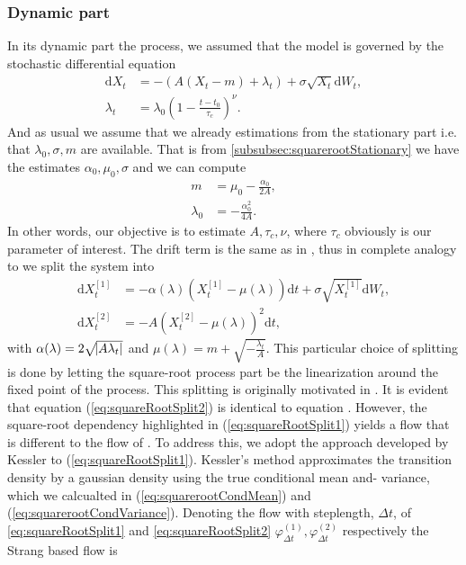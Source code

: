\subsubsection{Dynamic part}\label{subsubsec:squarerootDynamic}
In its dynamic part the process, we assumed that the model is governed by the stochastic differential equation
\begin{align}
    \mathrm{d}X_t &= -\left(A\left(X_t - m\right) + \lambda_t\right) + \sigma \sqrt{X_t} \mathrm{d}W_t, \label{eq:dynamicsquarerootSDE}\\
    \lambda_t &= \lambda_0\left(1 - \frac{t - t_0}{\tau_c}\right)^\nu.
\end{align}
And as usual we assume that we already estimations from the stationary part i.e. that $\lambda_0, \sigma, m$ are available. That is from \ref{subsubsec:squarerootStationary} we have the estimates $\alpha_0, \mu_0, \sigma$ and we can compute
\begin{align}
    m &= \mu_0 - \frac{\alpha_0}{2A},\\
    \lambda_0 &= - \frac{\alpha_0^2}{4A}.
\end{align}
In other words, our objective is to estimate $A, \tau_c, \nu$, where $\tau_c$ obviously is our parameter of interest. The drift term is the same as in \cite{Ditlevsen2023}, thus in complete analogy to \cite[(S9, S10)]{DitlevsenSupplementary} we split the system into
\begin{align}
    \mathrm{d}X_t^{[1]} &= -\alpha(\lambda)\left(X_t^{[1]} - \mu(\lambda)\right)  \mathrm{d}t + \sigma \sqrt{X_t^{[1]}} \mathrm{d}W_t, \label{eq:squareRootSplit1} \\
    \mathrm{d}X_t^{[2]} &= - A \left(X_t^{[2]} - \mu(\lambda)\right)^2 \mathrm{d}t, \label{eq:squareRootSplit2}
\end{align}
with $\alpha(\lambda) = 2\sqrt{\abs{A\lambda_t}}$ and $\mu(\lambda) = m + \sqrt{-\frac{\lambda_t}{A}}$.
This particular choice of splitting is done by letting the square-root process part be the linearization around the fixed point of the process. This splitting is originally motivated in \cite[section 2.3 and 2.5]{SplittingSchemes}. It is evident that equation (\ref{eq:squareRootSplit2}) is identical to equation \cite[(S10)]{DitlevsenSupplementary}. However, the square-root dependency highlighted in (\ref{eq:squareRootSplit1}) yields a flow that is different to the flow of \cite[(S9)]{DitlevsenSupplementary}. To address this, we adopt the approach developed by Kessler \cite{Kessler1997} to (\ref{eq:squareRootSplit1}). Kessler's method approximates the transition density by a gaussian density using the true conditional mean and- variance, which we calcualted in (\ref{eq:squarerootCondMean}) and (\ref{eq:squarerootCondVariance}). Denoting the flow with steplength, $\Delta t$, of \ref{eq:squareRootSplit1} and \ref{eq:squareRootSplit2} $\varphi_{\Delta t}^{(1)}, \varphi_{\Delta t}^{(2)}$ respectively the Strang based flow is 
